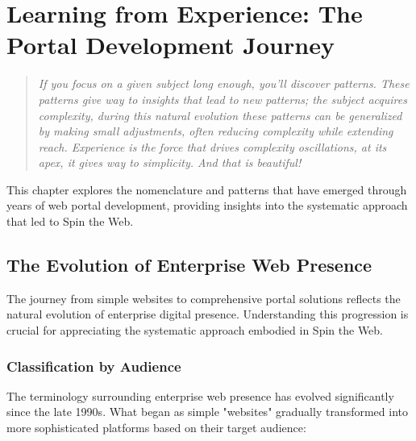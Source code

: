 
\chapter{Learning from Experience: The Portal Development Journey}
\label{chap:learning}

\begin{quote}
\textit{If you focus on a given subject long enough, you'll discover patterns. These patterns give way to insights that lead to new patterns; the subject acquires complexity, during this natural evolution these patterns can be generalized by making small adjustments, often reducing complexity while extending reach. Experience is the force that drives complexity oscillations, at its apex, it gives way to simplicity. And that is beautiful!}
\end{quote}

This chapter explores the nomenclature and patterns that have emerged through years of web portal development, providing insights into the systematic approach that led to Spin the Web.

\section{The Evolution of Enterprise Web Presence}

The journey from simple websites to comprehensive portal solutions reflects the natural evolution of enterprise digital presence. Understanding this progression is crucial for appreciating the systematic approach embodied in Spin the Web.

\subsection{Classification by Audience}

The terminology surrounding enterprise web presence has evolved significantly since the late 1990s. What began as simple "websites" gradually transformed into more sophisticated platforms based on their target audience:

